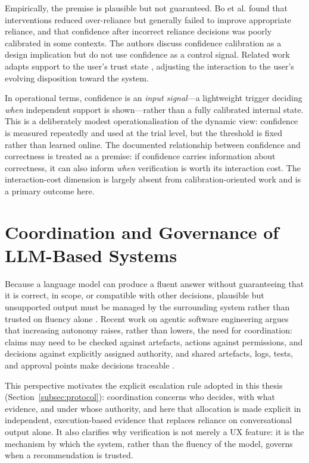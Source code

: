 \documentclass[oneside,final,14pt,a4paper]{extreport}
\begin{document}
Empirically, the premise is plausible but not guaranteed. Bo et al.
\cite{Bo2025} found that interventions reduced over-reliance but generally
failed to improve appropriate reliance, and that confidence after incorrect
reliance decisions was poorly calibrated in some contexts. The authors discuss
confidence calibration as a design implication but do not use confidence as a
control signal. Related work adapts support to the user's trust state
\cite{SrinivasanAdjustForTrust}, adjusting the interaction to the user's
evolving disposition toward the system.

In operational terms, confidence is an \emph{input signal}---a lightweight
trigger deciding \emph{when} independent support is shown---rather than a fully
calibrated internal state. This is a deliberately modest operationalisation of
the dynamic view: confidence is measured repeatedly and used at the trial level,
but the threshold is fixed rather than learned online. The documented
relationship between confidence and correctness is treated as a premise: if
confidence carries information about correctness, it can also inform \emph{when}
verification is worth its interaction cost. The interaction-cost dimension is
largely absent from calibration-oriented work and is a primary outcome here.

\section{Coordination and Governance of LLM-Based Systems}
\label{sec:lit-coordination}

Because a language model can produce a fluent answer without guaranteeing that
it is correct, in scope, or compatible with other decisions, plausible but
unsupported output must be managed by the surrounding system rather than trusted
on fluency alone \cite{Ciancarini2027}. Recent work on agentic software
engineering argues that increasing autonomy raises, rather than lowers, the need
for coordination: claims may need to be checked against artefacts, actions
against permissions, and decisions against explicitly assigned authority, and
shared artefacts, logs, tests, and approval points make decisions traceable
\cite{Ciancarini2027}.

This perspective motivates the explicit escalation rule adopted in this thesis
(Section~\ref{subsec:protocol}): coordination concerns who decides, with what
evidence, and under whose authority, and here that allocation is made explicit
in independent, execution-based evidence that replaces reliance on
conversational output alone.
It also clarifies why verification is not merely a UX feature: it is the
mechanism by which the system, rather than the fluency of the model, governs
when a recommendation is trusted.
\end{document}

